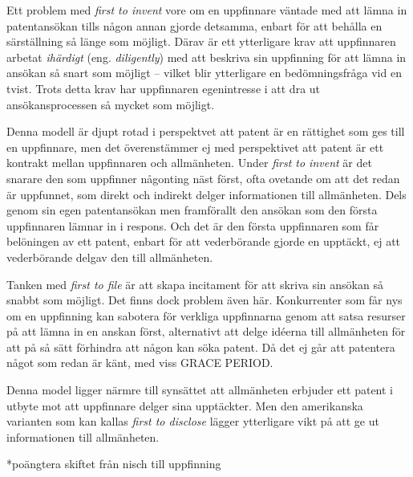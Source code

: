 Ett problem med \emph{first to invent} vore om en uppfinnare väntade med att lämna in patentansökan tills någon annan gjorde detsamma, enbart för att behålla en särställning så länge som möjligt. Därav är ett ytterligare krav att uppfinnaren arbetat \emph{ihärdigt} (eng. \emph{diligently}) med att beskriva sin uppfinning för att lämna in ansökan så snart som möjligt\cite{cmu-overview} -- vilket blir ytterligare en bedömningsfråga vid en tvist\cite{cmu-overview}. Trots detta krav har uppfinnaren egenintresse i att dra ut ansökansprocessen så mycket som möjligt.

Denna modell är djupt rotad i perspektvet att patent är en rättighet som ges till en uppfinnare, men det överenstämmer ej med perspektivet att patent är ett kontrakt mellan uppfinnaren och allmänheten. Under \emph{first to invent} är det snarare den som uppfinner någonting näst först, ofta ovetande om att det redan är uppfunnet, som direkt och indirekt delger informationen till allmänheten. Dels genom sin egen patentansökan men framförallt den ansökan som den första uppfinnaren lämnar in i respons. Och det är den första uppfinnaren som får belöningen av ett patent, enbart för att vederbörande gjorde en upptäckt, ej att vederbörande delgav den till allmänheten.

Tanken med \emph{first to file} är att skapa incitament för att skriva sin ansökan så snabbt som möjligt. Det finns dock problem även här. Konkurrenter som får nys om en uppfinning kan sabotera för verkliga uppfinnarna genom att satsa resurser på att lämna in en anskan först, alternativt att delge idéerna till allmänheten för att på så sätt förhindra att någon kan söka patent. Då det ej går att patentera något som redan är känt, med viss GRACE PERIOD.

Denna model ligger närmre till synsättet att allmänheten erbjuder ett patent i utbyte mot att uppfinnare delger sina upptäckter. Men den amerikanska varianten som kan kallas \emph{first to disclose} lägger ytterligare vikt på att ge ut informationen till allmänheten. 


*poängtera skiftet från nisch till uppfinning